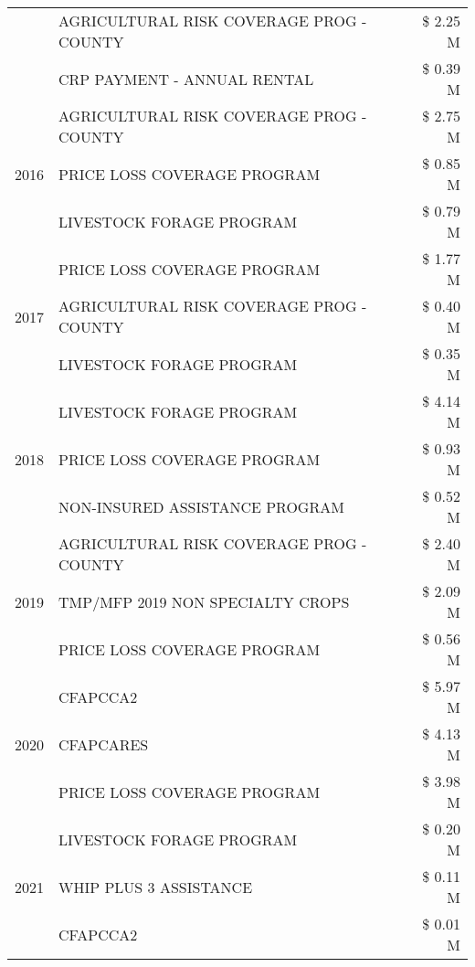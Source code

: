 \begin{tabular}{llr}
 & AGRICULTURAL RISK COVERAGE PROG - COUNTY & \$ 2.25 M \\
 & CRP PAYMENT - ANNUAL RENTAL & \$ 0.39 M \\
\cline{1-3}
\multirow[t]{3}{*}{2016} & AGRICULTURAL RISK COVERAGE PROG - COUNTY & \$ 2.75 M \\
 & PRICE LOSS COVERAGE PROGRAM & \$ 0.85 M \\
 & LIVESTOCK FORAGE PROGRAM & \$ 0.79 M \\
\cline{1-3}
\multirow[t]{3}{*}{2017} & PRICE LOSS COVERAGE PROGRAM & \$ 1.77 M \\
 & AGRICULTURAL RISK COVERAGE PROG - COUNTY & \$ 0.40 M \\
 & LIVESTOCK FORAGE PROGRAM & \$ 0.35 M \\
\cline{1-3}
\multirow[t]{3}{*}{2018} & LIVESTOCK FORAGE PROGRAM & \$ 4.14 M \\
 & PRICE LOSS COVERAGE PROGRAM & \$ 0.93 M \\
 & NON-INSURED ASSISTANCE PROGRAM & \$ 0.52 M \\
\cline{1-3}
\multirow[t]{3}{*}{2019} & AGRICULTURAL RISK COVERAGE PROG - COUNTY & \$ 2.40 M \\
 & TMP/MFP 2019 NON SPECIALTY CROPS & \$ 2.09 M \\
 & PRICE LOSS COVERAGE PROGRAM & \$ 0.56 M \\
\cline{1-3}
\multirow[t]{3}{*}{2020} & CFAPCCA2 & \$ 5.97 M \\
 & CFAPCARES & \$ 4.13 M \\
 & PRICE LOSS COVERAGE PROGRAM & \$ 3.98 M \\
\cline{1-3}
\multirow[t]{3}{*}{2021} & LIVESTOCK FORAGE PROGRAM & \$ 0.20 M \\
 & WHIP PLUS 3 ASSISTANCE & \$ 0.11 M \\
 & CFAPCCA2 & \$ 0.01 M \\
\cline{1-3}
\bottomrule
\end{tabular}
